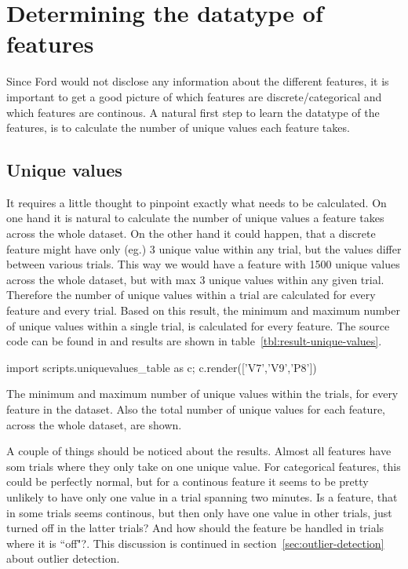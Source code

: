\section{Determining the datatype of features}
Since Ford would not disclose any information about the different features, it is important to get a good picture of which features are discrete/categorical and which features are continous. A natural first step to learn the datatype of the features, is to calculate the number of unique values each feature takes.
\subsection{Unique values}
It requires a little thought to pinpoint exactly what needs to be calculated. On one hand it is natural to calculate the number of unique values a feature takes across the whole dataset. On the other hand it could happen, that a discrete feature might have only (eg.) 3 unique value within any trial, but the values differ between various trials. This way we would have a feature with 1500 unique values across the whole dataset, but with max 3 unique values within any given trial. Therefore the number of unique values within a trial are calculated for every feature and every trial. Based on this result, the minimum and maximum number of unique values within a single trial, is calculated for every feature. The source code can be found in  and results are shown in table~\ref{tbl:result-unique-values}. \par
\begin{table}
    {\small\sffamily
        \begin{python}
            import scripts.uniquevalues_table as c; c.render(['V7','V9','P8'])
        \end{python}
    }
    \caption{The minimum and maximum number of unique values within the trials, for every feature in the dataset. Also the total number of unique values for each feature, across the whole dataset, are shown.}
    \label{tbl:result-unique-values}
\end{table}
A couple of things should be noticed about the results. Almost all features have som trials where they only take on one unique value. For categorical features, this could be perfectly normal, but for a continous feature it seems to be pretty unlikely to have only one value in a trial spanning two minutes. Is a feature, that in some trials seems continous, but then only have one value in other trials, just turned off in the latter trials? And how should the feature be handled in trials where it is ``off"?. This discussion is continued in section~\ref{sec:outlier-detection} about outlier detection. \par

